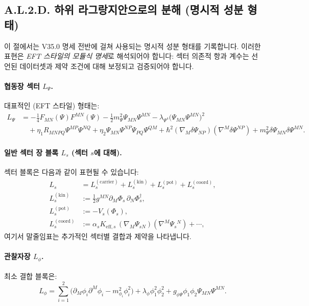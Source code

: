 \documentclass[13pt,a4paper]{article}
\begin{document}
	\subsection*{A.L.2.D. 하위 라그랑지안으로의 분해 (명시적 성분 형태)}
	
	이 절에서는 V35.0 명세 전반에 걸쳐 사용되는 명시적 성분 형태를 기록합니다. 이러한 표현은 \emph{EFT 스타일의 모듈식 명세}로 해석되어야 합니다: 섹터 의존적 항과 계수는 선언된 데이터셋과 제약 조건에 대해 보정되고 검증되어야 합니다.
	
	\paragraph{협동장 섹터 $L_{\Psi}$.}
	대표적인 (EFT 스타일) 형태는:
	\begin{align}
		L_{\Psi} &=
		-\frac{1}{4}F_{MN}(\Psi)F^{MN}(\Psi)
		-\frac{1}{2}m_{\Psi}^2\Psi_{MN}\Psi^{MN}
		-\lambda_{\Psi^4}\big(\Psi_{MN}\Psi^{MN}\big)^2 \nonumber\\
		&\quad +\eta_1 R_{MNPQ}\Psi^{MP}\Psi^{NQ}
		+\eta_2 \Psi_{MN}\Psi^{NP}\Psi_{PQ}\Psi^{QM}
		+\hbar^2(\nabla_M\delta\Psi_{NP})(\nabla^M\delta\Psi^{NP})
		+m_{\Psi}^2\delta\Psi_{MN}\delta\Psi^{MN}.
	\end{align}
	
	\paragraph{일반 섹터 장 블록 $L_s$ (섹터 $s$에 대해).}
	섹터 블록은 다음과 같이 표현될 수 있습니다:
	\begin{align}
		L_s &= L^{(\mathrm{carrier})}_s + L^{(\mathrm{kin})}_s + L^{(\mathrm{pot})}_s + L^{(\mathrm{coord})}_s, \\
		L^{(\mathrm{kin})}_s &:= \frac{1}{2}g^{MN}\partial_M\Phi_s\,\partial_N\Phi_s^\dagger, \\
		L^{(\mathrm{pot})}_s &:= -V_s(\Phi_s), \\
		L^{(\mathrm{coord})}_s &:= \alpha_s K_{\mathrm{eff},s}\,(\nabla_M\Psi_{sN})(\nabla^M\Psi_{s}{}^{N}) + \cdots,
	\end{align}
	여기서 말줄임표는 추가적인 섹터별 결합과 제약을 나타냅니다.
	
	\paragraph{관찰자장 $L_{\phi}$.}
	최소 결합 블록은:
	\begin{equation}
		L_{\phi}=\sum_{i=1}^{2}\Big(\partial_M\phi_i\partial^M\phi_i - m_{\phi_i}^2\phi_i^2\Big) + \lambda_{\phi}\phi_1^2\phi_2^2 + g_{\phi\Psi}\phi_1\phi_2\Psi_{MN}\Psi^{MN}.
	\end{equation}
	
\end{document}
